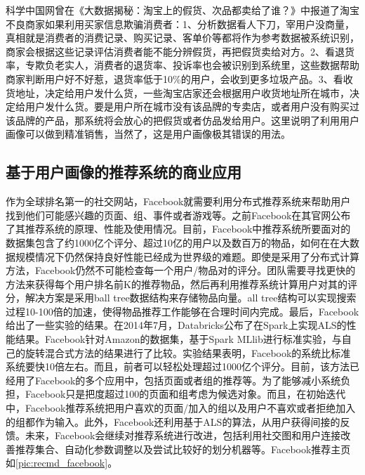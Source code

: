 	科学中国网曾在《大数据揭秘：淘宝上的假货、次品都卖给了谁？》中报道了淘宝不良商家如果利用买家信息欺骗消费者\citep{liar_taobao}：1、分析数据看人下刀，宰用户没商量，真相就是消费者的消费记录、购买记录、客单价等都将作为参考数据被系统识别，商家会根据这些记录评估消费者能不能分辨假货，再把假货卖给对方。2、看退货率，专欺负老实人，消费者的退货率、投诉率也会被识别到系统里，这些数据帮助商家判断用户好不好惹，退货率低于10\%的用户，会收到更多垃圾产品。3、看收货地址，决定给用户发什么货，一些淘宝店家还会根据用户收货地址所在城市，决定给用户发什么货。要是用户所在城市没有该品牌的专卖店，或者用户没有购买过该品牌的产品，那系统将会放心的把假货或者仿品发给用户。这里说明了利用用户画像可以做到精准销售，当然了，这是用户画像极其错误的用法。
		\subsection{基于用户画像的推荐系统的商业应用}
		\begin{figure}
	    \centering
	      \label{pic:recmd_facebook}
	    \end{figure}
		作为全球排名第一的社交网站，Facebook就需要利用分布式推荐系统来帮助用户找到他们可能感兴趣的页面、组、事件或者游戏等。之前Facebook在其官网公布了其推荐系统的原理、性能及使用情况\citep{recmd-facebook}。目前，Facebook中推荐系统所要面对的数据集包含了约1000亿个评分、超过10亿的用户以及数百万的物品，如何在在大数据规模情况下仍然保持良好性能已经成为世界级的难题。即使是采用了分布式计算方法，Facebook仍然不可能检查每一个用户/物品对的评分。团队需要寻找更快的方法来获得每个用户排名前K的推荐物品，然后再利用推荐系统计算用户对其的评分，解决方案是采用ball tree数据结构来存储物品向量。all tree结构可以实现搜索过程10-100倍的加速，使得物品推荐工作能够在合理时间内完成。最后，Facebook给出了一些实验的结果。在2014年7月，Databricks公布了在Spark上实现ALS的性能结果。Facebook针对Amazon的数据集，基于Spark MLlib进行标准实验，与自己的旋转混合式方法的结果进行了比较。实验结果表明，Facebook的系统比标准系统要快10倍左右。而且，前者可以轻松处理超过1000亿个评分。目前，该方法已经用了Facebook的多个应用中，包括页面或者组的推荐等。为了能够减小系统负担，Facebook只是把度超过100的页面和组考虑为候选对象。而且，在初始迭代中，Facebook推荐系统把用户喜欢的页面/加入的组以及用户不喜欢或者拒绝加入的组都作为输入。此外，Facebook还利用基于ALS的算法，从用户获得间接的反馈。未来，Facebook会继续对推荐系统进行改进，包括利用社交图和用户连接改善推荐集合、自动化参数调整以及尝试比较好的划分机器等。Facebook推荐主页如\autoref{pic:recmd_facebook}。
		
